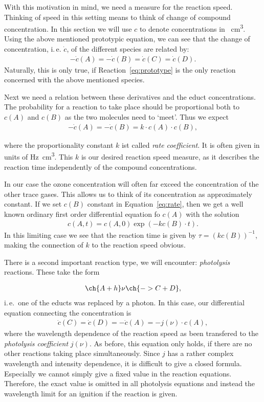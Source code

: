 With this motivation in mind, we need a measure for the reaction
speed. Thinking of speed in this setting means to think of change of
compound concentration. In this section we will use $c$ to denote
concentrations in \si{\per\cubic\centi\meter}. Using the above
mentioned prototypic equation, we can
see that the change of concentration, i.\,e. $\dot c$, of the
different species are related by:
\begin{align*}
  -\dot c(A) = - \dot c(B) = \dot c(C) = \dot c(D).
\end{align*}
Naturally, this is only true, if Reaction~\eqref{eq:prototype} is the
only reaction concerned with the above mentioned species.

Next we need a relation between these derivatives and the educt
concentrations. The probability for a reaction to take place should be
proportional both to $c(A)$ and $c(B)$ as the two molecules need to
`meet'. Thus we expect
\begin{align}
  -\dot c(A) = - \dot c(B) = k \cdot c(A) \cdot c(B), \label{eq:rate}
\end{align}

where the proportionality constant $k$ ist called \emph{rate
  coefficient}. It is often given in units of
\si{\hertz\cubic\centi\meter}. This $k$ is our desired reaction
speed measure, as it describes the
reaction time independently of the compound concentrations.

In our case the ozone concentration will often far exceed the
concentration of the other trace gases. This allows us to think of its
concentration as approximately constant. If we set $c(B)$ constant in
Equation~\eqref{eq:rate}, then we get a well known ordinary first
order differential equation fo $c(A)$ with the solution
\begin{align*}
  c(A,t) = c(A,0)\exp(-kc(B)\cdot t).
\end{align*}
In this limiting case we see that the reaction time is given by $\tau =
(kc(B))^{-1}$, making the connection of $k$ to the reaction speed
obvious.

There is a second important reaction type, we will encounter:
\emph{photolysis} reactions. These take the form

\begin{align}
  \ch{A + h}\nu \ch{-> C + D},
\end{align}
i.\,e.\ one of the educts was replaced by a photon. In this case, our
differential equation connecting the concentration is
\begin{align}
  \dot c(C) = \dot c(D) = -\dot c(A) = - j(\nu) \cdot c(A),
\end{align}
where the wavelength dependence of the reaction speed as been
transfered to the \emph{photolysis coefficient} $j(\nu)$. As before,
this equation only holds, if there are no other reactions taking place
simultaneously. Since $j$ has a rather complex wavelength and intensity
dependence, it is difficult to give a closed formula. Especially we
cannot simply give a fixed value in the reaction equations. Therefore,
the exact value is omitted in all photolysis equations and instead the
wavelength limit for an ignition if the reaction is given.

